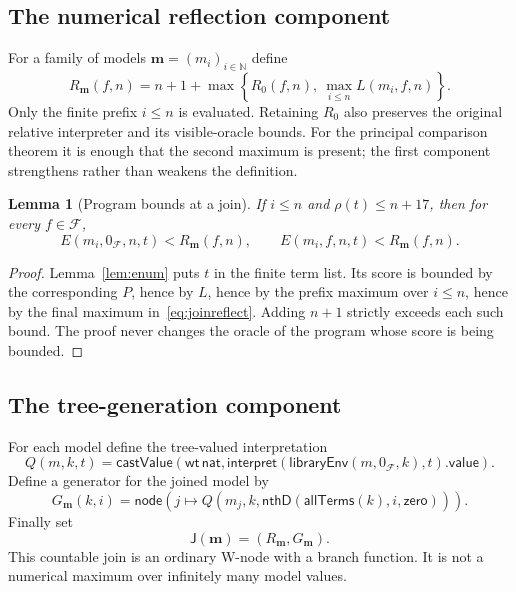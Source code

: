 \documentclass[11pt,letterpaper]{article}
\newtheorem{lemma}[theorem]{Lemma}
\theoremstyle{definition}
\newcommand{\N}{\mathbb N}
\newcommand{\Fam}{\mathcal F}
\newcommand{\node}{\mathsf{node}}
\renewcommand{\Join}{\mathsf J}
\begin{document}
\subsection{The numerical reflection component}

For a family of models $\mathbf m=(m_i)_{i\in\N}$ define
\begin{equation}
 R_{\mathbf m}(f,n)=n+1+
 \max\left\{R_0(f,n),\ \max_{i\le n}L(m_i,f,n)\right\}.
\label{eq:joinreflect}
\end{equation}
Only the finite prefix $i\le n$ is evaluated. Retaining $R_0$ also preserves
the original relative interpreter and its visible-oracle bounds. For the
principal comparison theorem it is enough that the second maximum is
present; the first component strengthens rather than weakens the definition.

\begin{lemma}[Program bounds at a join]
\label{lem:joinprogram}
If $i\le n$ and $\rho(t)\le n+17$, then for every $f\in\Fam$,
\[
 E(m_i,0_{\Fam},n,t)<R_{\mathbf m}(f,n),\qquad
 E(m_i,f,n,t)<R_{\mathbf m}(f,n).
\]
\end{lemma}
\begin{proof}
Lemma~\ref{lem:enum} puts $t$ in the finite term list. Its score is bounded by
the corresponding $P$, hence by $L$, hence by the prefix maximum over
$i\le n$, hence by the final maximum in~\eqref{eq:joinreflect}. Adding $n+1$
strictly exceeds each such bound. The proof never changes the oracle of the
program whose score is being bounded.
\end{proof}

\subsection{The tree-generation component}

For each model define the tree-valued interpretation
\[
 Q(m,k,t)=\mathsf{castValue}\left(
   \mathsf{wt}\,\mathsf{nat},
   \mathsf{interpret}(\mathsf{libraryEnv}(m,0_{\Fam},k),t).\mathsf{value}
                                      \right).
\]
Define a generator for the joined model by
\begin{equation}
 G_{\mathbf m}(k,i)=\node\left(j\mapsto
 Q\left(m_j,k,\mathsf{nthD}(\mathsf{allTerms}(k),i,\mathsf{zero})\right)
                               \right).
\label{eq:jointrees}
\end{equation}
Finally set
\[
 \Join(\mathbf m)=(R_{\mathbf m},G_{\mathbf m}).
\]
This countable join is an ordinary W-node with a branch function. It is not a
numerical maximum over infinitely many model values.
\end{document}
